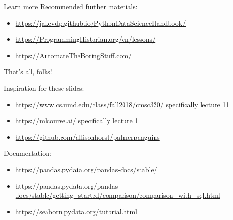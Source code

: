 \documentclass[aspectratio=169,usenames,dvipsnames]{beamer}
\begin{document}
\begin{frame}{Learn more}
    Recommended further materials:
    \vspace{1em}
    \begin{itemize}
        \item \url{https://jakevdp.github.io/PythonDataScienceHandbook/}
        \item \url{https://ProgrammingHistorian.org/en/lessons/}
        \item \url{https://AutomateTheBoringStuff.com/}
    \end{itemize}
\end{frame}


\begin{frame}\Huge\centering
    That's all, folks!
\end{frame}


\begin{frame}
Inspiration for these slides:
\begin{itemize}
\item \url{https://www.cs.umd.edu/class/fall2018/cmsc320/}
    specifically lecture 11
\item \url{https://mlcourse.ai/}
    specifically lecture 1
\item \url{https://github.com/allisonhorst/palmerpenguins}
\end{itemize}

\vspace{1em}
Documentation:
\begin{itemize}
    \item \url{https://pandas.pydata.org/pandas-docs/stable/}
    \item \url{https://pandas.pydata.org/pandas-docs/stable/getting_started/comparison/comparison_with_sql.html}
    \item \url{https://seaborn.pydata.org/tutorial.html}
\end{itemize}
\end{frame}
\end{document}
